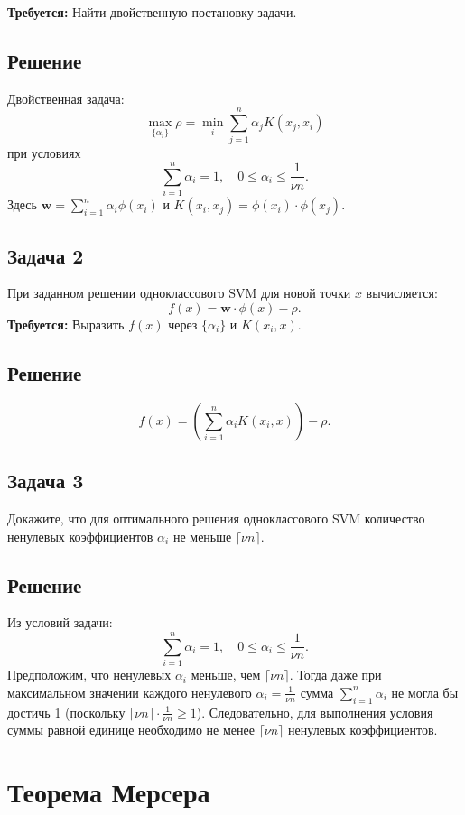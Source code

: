 \textbf{Требуется:} Найти двойственную постановку задачи.

\subsection{Решение}
Двойственная задача:
\[
    \max_{\{\alpha_i\}} \rho = \min_i \sum_{j=1}^n \alpha_j K(x_j,x_i)
\]
при условиях
\[
    \sum_{i=1}^n \alpha_i = 1,\quad 0 \le \alpha_i \le \frac{1}{\nu n}.
\]
Здесь $\mathbf{w} = \sum_{i=1}^n \alpha_i \phi(x_i)$ и $K(x_i,x_j)=\phi(x_i)\cdot \phi(x_j)$.

\hrulefill

\subsection{Задача 2}
При заданном решении одноклассового SVM для новой точки $x$ вычисляется:
\[
    f(x)=\mathbf{w}\cdot\phi(x)-\rho.
\]
\textbf{Требуется:} Выразить $f(x)$ через $\{\alpha_i\}$ и $K(x_i,x)$.

\subsection{Решение}
\[
    f(x) = \left(\sum_{i=1}^n \alpha_i K(x_i,x)\right) - \rho.
\]

\hrulefill

\subsection{Задача 3}
Докажите, что для оптимального решения одноклассового SVM количество ненулевых коэффициентов $\alpha_i$ не меньше $\lceil\nu n\rceil$.

\subsection{Решение}
Из условий задачи:
\[
    \sum_{i=1}^n \alpha_i = 1,\quad 0 \le \alpha_i \le \frac{1}{\nu n}.
\]
Предположим, что ненулевых $\alpha_i$ меньше, чем $\lceil\nu n\rceil$. Тогда даже при максимальном значении каждого ненулевого $\alpha_i = \frac{1}{\nu n}$ сумма $\sum_{i=1}^n \alpha_i$ не могла бы достичь 1 (поскольку $\lceil \nu n \rceil \cdot \frac{1}{\nu n}\ge1$). Следовательно, для выполнения условия суммы равной единице необходимо не менее $\lceil\nu n\rceil$ ненулевых коэффициентов.


\section{Теорема Мерсера}

